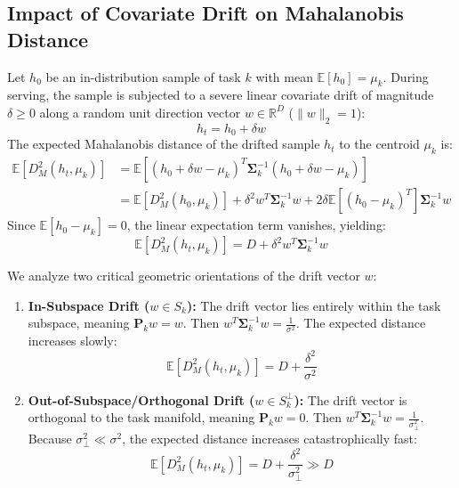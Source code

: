 \documentclass{article}
\theoremstyle{plain}
\theoremstyle{definition}
\theoremstyle{remark}
\begin{document}
\subsection{Impact of Covariate Drift on Mahalanobis Distance}
Let $h_0$ be an in-distribution sample of task $k$ with mean $\mathbb{E}[h_0] = \mu_k$. During serving, the sample is subjected to a severe linear covariate drift of magnitude $\delta \ge 0$ along a random unit direction vector $w \in \mathbb{R}^D$ ($\|w\|_2 = 1$):
\begin{equation}
h_t = h_0 + \delta w
\end{equation}
The expected Mahalanobis distance of the drifted sample $h_t$ to the centroid $\mu_k$ is:
\begin{align}
\mathbb{E}[D_M^2(h_t, \mu_k)] &= \mathbb{E}[(h_0 + \delta w - \mu_k)^T \mathbf{\Sigma}_k^{-1} (h_0 + \delta w - \mu_k)] \\
&= \mathbb{E}[D_M^2(h_0, \mu_k)] + \delta^2 w^T \mathbf{\Sigma}_k^{-1} w + 2\delta \mathbb{E}[(h_0 - \mu_k)^T] \mathbf{\Sigma}_k^{-1} w
\end{align}
Since $\mathbb{E}[h_0 - \mu_k] = 0$, the linear expectation term vanishes, yielding:
\begin{equation}
\label{eq:expected_drift_distance}
\mathbb{E}[D_M^2(h_t, \mu_k)] = D + \delta^2 w^T \mathbf{\Sigma}_k^{-1} w
\end{equation}

We analyze two critical geometric orientations of the drift vector $w$:
\begin{enumerate}
    \item \textbf{In-Subspace Drift ($w \in S_k$):} The drift vector lies entirely within the task subspace, meaning $\mathbf{P}_k w = w$. Then $w^T \mathbf{\Sigma}_k^{-1} w = \frac{1}{\sigma^2}$. The expected distance increases slowly:
    \begin{equation}
    \mathbb{E}[D_M^2(h_t, \mu_k)] = D + \frac{\delta^2}{\sigma^2}
    \end{equation}
    \item \textbf{Out-of-Subspace/Orthogonal Drift ($w \in S_k^\perp$):} The drift vector is orthogonal to the task manifold, meaning $\mathbf{P}_k w = 0$. Then $w^T \mathbf{\Sigma}_k^{-1} w = \frac{1}{\sigma_\perp^2}$. Because $\sigma_\perp^2 \ll \sigma^2$, the expected distance increases catastrophically fast:
    \begin{equation}
    \mathbb{E}[D_M^2(h_t, \mu_k)] = D + \frac{\delta^2}{\sigma_\perp^2} \gg D
    \end{equation}
\end{enumerate}
\end{document}
